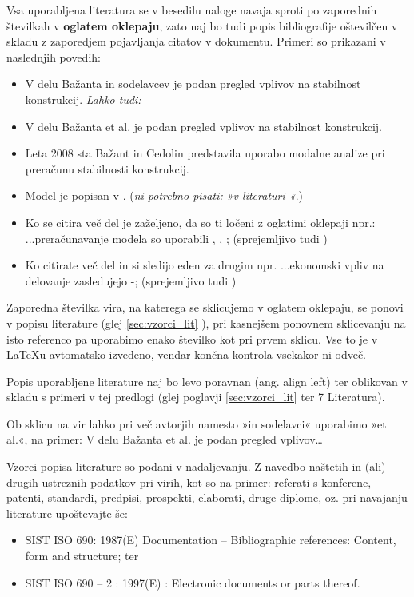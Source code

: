 Vsa uporabljena literatura se v besedilu naloge navaja sproti po zaporednih 
številkah v \textbf{oglatem oklepaju}, zato naj bo tudi popis bibliografije 
oštevilčen v skladu z zaporedjem pojavljanja citatov v dokumentu. Primeri so 
prikazani v naslednjih povedih:
\begin{itemize}
	\item V delu Bažanta in sodelavcev \cite{bazant_1991} je podan pregled 
	vplivov na stabilnost konstrukcij. \emph{Lahko tudi:}
	\item V delu Bažanta et al. \cite{bazant_1991} je podan pregled vplivov na 
	stabilnost konstrukcij.
	\item Leta 2008 sta Bažant in Cedolin \cite{Bazant_2008} predstavila 
	uporabo modalne analize pri pre\-ra\-ču\-nu stabilnosti konstrukcij.
	\item Model je popisan v \cite{Doe_1991}. (\emph{ni potrebno pisati: »v 
		literaturi \cite{Doe_1991}«}.)
	\item Ko se citira več del je zaželjeno, da so ti ločeni z oglatimi 
	oklepaji npr.:  ...preračunavanje modela so uporabili \cite{bazant_1991}, 
	\cite{Doe_1991}, \cite{Bazant_2008}; (sprejemljivo tudi 
	\cite{bazant_1991,Doe_1991,Bazant_2008}) 
	\item Ko citirate več del in si sledijo eden za drugim npr. ...ekonomski 
	vpliv na delovanje zasledujejo \cite{bazant_1991}-\cite{Bazant_2008}; 
	(sprejemljivo tudi \cite{bazant_1991, stropnik_1997, 
		Doe_1991,Loukides_2020, Bazant_2008})
\end{itemize}

Zaporedna številka vira, na katerega se sklicujemo v oglatem oklepaju, se 
ponovi v popisu literature (glej \ref{sec:vzorci_lit} 
), pri kasnejšem ponovnem sklicevanju na isto referenco 
pa uporabimo enako številko kot pri prvem sklicu. Vse to je v \LaTeX u 
avtomatsko izvedeno, vendar končna kontrola vsekakor ni odveč.

Popis uporabljene literature naj bo levo poravnan (ang. align left) ter 
oblikovan v skladu s primeri v tej predlogi (glej poglavji \ref{sec:vzorci_lit} 
 ter 7 Literatura).

Ob sklicu na vir lahko pri več avtorjih namesto »in sodelavci« uporabimo »et 
al.«, na primer: V delu Bažanta et al. \cite{bazant_1991} je podan pregled 
vplivov\ldots

Vzorci popisa literature so podani v nadaljevanju. Z navedbo naštetih in (ali) 
drugih ustreznih podatkov pri virih, kot so na primer: referati s konferenc, 
patenti, standardi, predpisi, prospekti, elaborati, druge diplome, oz. pri 
navajanju literature upoštevajte še:
\begin{itemize}
	\item SIST ISO 690: 1987(E) Documentation – Bibliographic references: 
	Content, form and structure; ter
	\item SIST ISO 690 – 2 : 1997(E) : Electronic documents or parts thereof.
\end{itemize}


